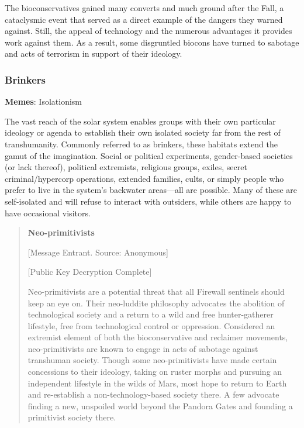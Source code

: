 The bioconservatives gained many converts and much ground after the Fall, a cataclysmic event that served as a direct example of the dangers they warned against. Still, the appeal of technology and the numerous advantages it provides work against them. As a result, some disgruntled biocons have turned to sabotage and acts of terrorism in support of their ideology. 

\subsubsection{Brinkers} \label{sec:brinkers} 

\textbf{Memes}: Isolationism 

The vast reach of the solar system enables groups with their own particular ideology or agenda to establish their own isolated society far from the rest of transhumanity. Commonly referred to as brinkers, these habitats extend the gamut of the imagination. Social or political experiments, gender-based societies (or lack thereof), political extremists, religious groups, exiles, secret criminal/hypercorp operations, extended families, cults, or simply people who prefer to live in the system's backwater areas—all are possible. Many of these are self-isolated and will refuse to interact with outsiders, while others are happy to have occasional visitors. 

\begin{quotation} \textbf{Neo-primitivists} 

[Message Entrant. Source: Anonymous] 

[Public Key Decryption Complete] 

Neo-primitivists are a potential threat that all Firewall sentinels should keep an eye on. Their neo-luddite philosophy advocates the abolition of technological society and a return to a wild and free hunter-gatherer lifestyle, free from technological control or oppression. Considered an extremist element of both the bioconservative and reclaimer movements, neo-primitivists are known to engage in acts of sabotage against transhuman society. Though some neo-primitivists have made certain concessions to their ideology, taking on ruster morphs and pursuing an independent lifestyle in the wilds of Mars, most hope to return to Earth and re-establish a non-technology-based society there. A few advocate finding a new, unspoiled world beyond the Pandora Gates and founding a primitivist society there. \end{quotation} 

